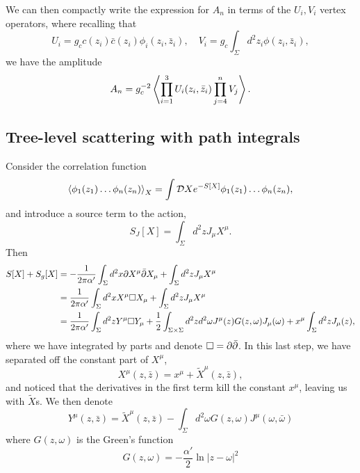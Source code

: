 We can then compactly write the expression for $A_n$ in terms of the $U_i,V_i$ vertex operators, where recalling that
\begin{equation}
    U_i = g_c c(z_i)\bar c (z_i) \phi_i (z_i, \bar z_i),\quad V_i = g_c \int_\Sigma d^2 z_i \phi(z_i,\bar z_i),
\end{equation}
we have the amplitude
\begin{equation}
    A_n = g_c^{-2} \left< \prod_{i=1}^3 U_i(z_i,\bar z_i) \prod_{j=4}^n V_j \right>.
\end{equation}

\subsection*{Tree-level scattering with path integrals}
Consider the correlation function
\begin{equation}
    \left< \phi_1(z_1)\ldots \phi_n(z_n) \right>_X= \int \mathcal{D} X e^{-S[X]}\phi_1(z_1)\ldots \phi_n(z_n),
\end{equation}
and introduce a source term to the action,
\begin{equation}
    S_J[X]=\int_\Sigma d^2 z J_\mu X^\mu.
\end{equation}
Then
\begin{align*}
    S[X]+S_g[X] &= -\frac{1}{2\pi \alpha'} \int_\Sigma d^2x \partial X^\mu \bar {\partial} X_\mu + \int_\Sigma d^2 z J_\mu X^\mu\\
    &= \frac{1}{2\pi \alpha'} \int_\Sigma d^2x  X^\mu \Box X_\mu + \int_\Sigma d^2 z J_\mu X^\mu\\
    &= \frac{1}{2\pi \alpha'} \int_\Sigma d^2 z Y^\mu \Box Y_\mu +\frac{1}{2} \int_{\Sigma \times \Sigma} d^2z d^2\omega J^\mu(z) G(z,\omega) J_\mu(\omega) + x^\mu \int_\Sigma d^2z J_\mu(z),
\end{align*}
where we have integrated by parts and denote $\Box=\partial \bar {\partial}$.
In this last step, we have separated off the constant part of $X^\mu$,
\begin{equation}
    X^\mu(z,\bar z)=x^\mu + \tilde X^\mu(z,\bar z),
\end{equation}
and noticed that the derivatives in the first term kill the constant $x^\mu$, leaving us with $\tilde X$s. We then denote
\begin{equation}
    Y^\mu(z,\bar z)=\tilde X^\mu(z,\bar z)-\int_\Sigma d^2 \omega G(z,\omega)J^\mu(\omega,\bar \omega)
\end{equation}
where $G(z,\omega)$ is the Green's function 
\begin{equation}
    G(z,\omega)=-\frac{\alpha'}{2} \ln|z-\omega|^2
\end{equation}
